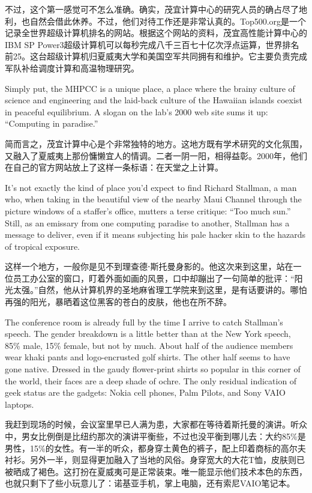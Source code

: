 \ifdefined\chs
不过，这个第一感觉可不怎么准确。确实，茂宜计算中心的研究人员的确占尽了地利，也自然会借此休养。不过，他们对待工作还是非常认真的。Top500.org是一个记录全世界超级计算机排名的网站。根据这个网站的资料，茂宜高性能计算中心的IBM SP Power3超级计算机可以每秒完成八千三百七十亿次浮点运算，世界排名前25。这台超级计算机归夏威夷大学和美国空军共同拥有和维护。它主要负责完成军队补给调度计算和高温物理研究。
\fi

\ifdefined\eng
Simply put, the MHPCC is a unique place, a place where the brainy culture of science and engineering and the laid-back culture of the Hawaiian islands coexist in peaceful equilibrium. A slogan on the lab's 2000 web site sums it up: ``Computing in paradise.''
\fi

\ifdefined\chs
简而言之，茂宜计算中心是个非常独特的地方。这地方既有学术研究的文化氛围，又融入了夏威夷上那份慵懒宜人的情调。二者一阴一阳，相得益彰。2000年，他们在自己的官方网站放上了这样一条标语：在天堂之上计算。
\fi

\ifdefined\eng
It's not exactly the kind of place you'd expect to find Richard Stallman, a man who, when taking in the beautiful view of the nearby Maui Channel through the picture windows of a staffer's office, mutters a terse critique: ``Too much sun.'' Still, as an emissary from one computing paradise to another, Stallman has a message to deliver, even if it means subjecting his pale hacker skin to the hazards of tropical exposure.
\fi

\ifdefined\chs
这样一个地方，一般你是见不到理查德⋅斯托曼身影的。他这次来到这里，站在一位员工办公室的窗口，盯着外面如画的风景，口中却蹦出了一句简单的批评：``阳光太强。''自然，他从计算机界的圣地麻省理工学院来到这里，是有话要讲的。哪怕再强的阳光，暴晒着这位黑客的苍白的皮肤，他也在所不辞。
\fi

\ifdefined\eng
The conference room is already full by the time I arrive to catch Stallman's speech. The gender breakdown is a little better than at the New York speech, 85\% male, 15\% female, but not by much. About half of the audience members wear khaki pants and logo-encrusted golf shirts. The other half seems to have gone native. Dressed in the gaudy flower-print shirts so popular in this corner of the world, their faces are a deep shade of ochre. The only residual indication of geek status are the gadgets: Nokia cell phones, Palm Pilots, and Sony VAIO laptops.
\fi

\ifdefined\chs
我赶到现场的时候，会议室里早已人满为患，大家都在等待着斯托曼的演讲。听众中，男女比例倒是比纽约那次的演讲平衡些，不过也没平衡到哪儿去：大约85\%是男性，15\%的女性。有一半的听众，都身穿土黄色的裤子，配上印着商标的高尔夫衬衫。另外一半，则显得更加融入了当地的风俗。身穿宽大的大花T恤，皮肤则已被晒成了褐色。这打扮在夏威夷可是正常装束。唯一能显示他们技术本色的东西，也就只剩下了些小玩意儿了：诺基亚手机，掌上电脑，还有索尼VAIO笔记本。
\fi

